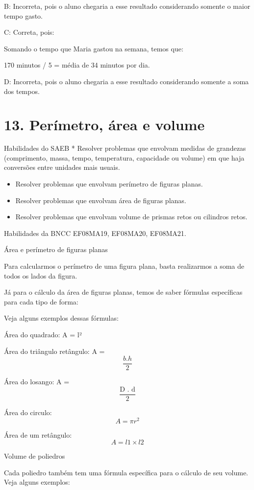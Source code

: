 B: Incorreta, pois o aluno chegaria a esse resultado considerando
somente o maior tempo gasto.

C: Correta, pois:

Somando o tempo que Maria gastou na semana, temos que:

170 minutos / 5 = média de 34 minutos por dia.

D: Incorreta, pois o aluno chegaria a esse resultado considerando
somente a soma dos tempos.

\hypertarget{peruxedmetro-uxe1rea-e-volume}{%
\section{13. Perímetro, área e
volume}\label{peruxedmetro-uxe1rea-e-volume}}

Habilidades do SAEB * Resolver problemas que envolvam medidas de
grandezas (comprimento, massa, tempo, temperatura, capacidade ou volume)
em que haja conversões entre unidades mais usuais.

\begin{itemize}
\item
  Resolver problemas que envolvam perímetro de figuras planas.
\item
  Resolver problemas que envolvam área de figuras planas.
\item
  Resolver problemas que envolvam volume de prismas retos ou cilindros
  retos.
\end{itemize}

Habilidades da BNCC EF08MA19, EF08MA20, EF08MA21.

Área e perímetro de figuras planas

Para calcularmos o perímetro de uma figura plana, basta realizarmos a
soma de todos os lados da figura.

Já para o cálculo da área de figuras planas, temos de saber fórmulas
específicas para cada tipo de forma:

Veja alguns exemplos dessas fórmulas:

Área do quadrado: A = l²

Área do triângulo retângulo: A = \[\frac{b.h}{2}\]

Área do losango: A = \[\frac{\text{D . d}}{2}\]

Área do circulo: \[A = \pi r^{2}\]

Área de um retângulo: \[A = l1 \times l2\]

Volume de poliedros

Cada poliedro também tem uma fórmula específica para o cálculo de seu
volume. Veja alguns exemplos:

